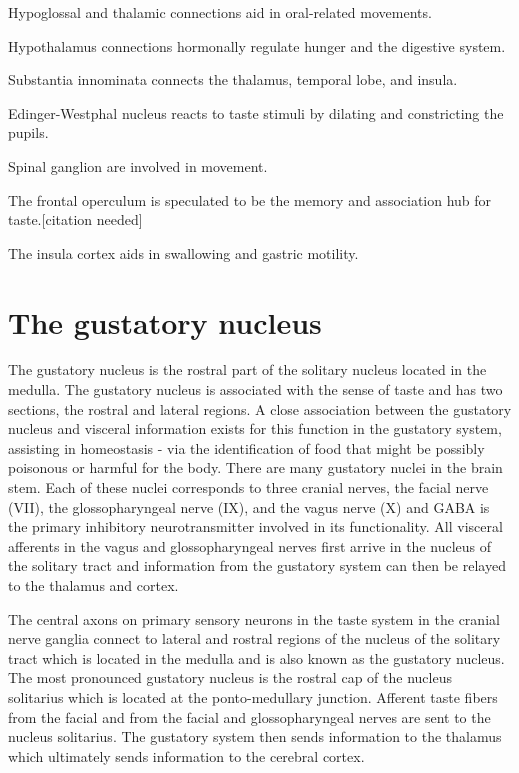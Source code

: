 Hypoglossal and thalamic connections aid in oral-related movements.

Hypothalamus connections hormonally regulate hunger and the digestive system.

Substantia innominata connects the thalamus, temporal lobe, and insula.

Edinger-Westphal nucleus reacts to taste stimuli by dilating and constricting the pupils.

Spinal ganglion are involved in movement.

The frontal operculum is speculated to be the memory and association hub for taste.{[}citation needed{]}

The insula cortex aids in swallowing and gastric motility.

\hypertarget{the-gustatory-nucleus}{%
\section{The gustatory nucleus}\label{the-gustatory-nucleus}}

The gustatory nucleus is the rostral part of the solitary nucleus located in the medulla. The gustatory nucleus is associated with the sense of taste and has two sections, the rostral and lateral regions. A close association between the gustatory nucleus and visceral information exists for this function in the gustatory system, assisting in homeostasis - via the identification of food that might be possibly poisonous or harmful for the body. There are many gustatory nuclei in the brain stem. Each of these nuclei corresponds to three cranial nerves, the facial nerve (VII), the glossopharyngeal nerve (IX), and the vagus nerve (X) and GABA is the primary inhibitory neurotransmitter involved in its functionality. All visceral afferents in the vagus and glossopharyngeal nerves first arrive in the nucleus of the solitary tract and information from the gustatory system can then be relayed to the thalamus and cortex.

The central axons on primary sensory neurons in the taste system in the cranial nerve ganglia connect to lateral and rostral regions of the nucleus of the solitary tract which is located in the medulla and is also known as the gustatory nucleus. The most pronounced gustatory nucleus is the rostral cap of the nucleus solitarius which is located at the ponto-medullary junction. Afferent taste fibers from the facial and from the facial and glossopharyngeal nerves are sent to the nucleus solitarius. The gustatory system then sends information to the thalamus which ultimately sends information to the cerebral cortex.

